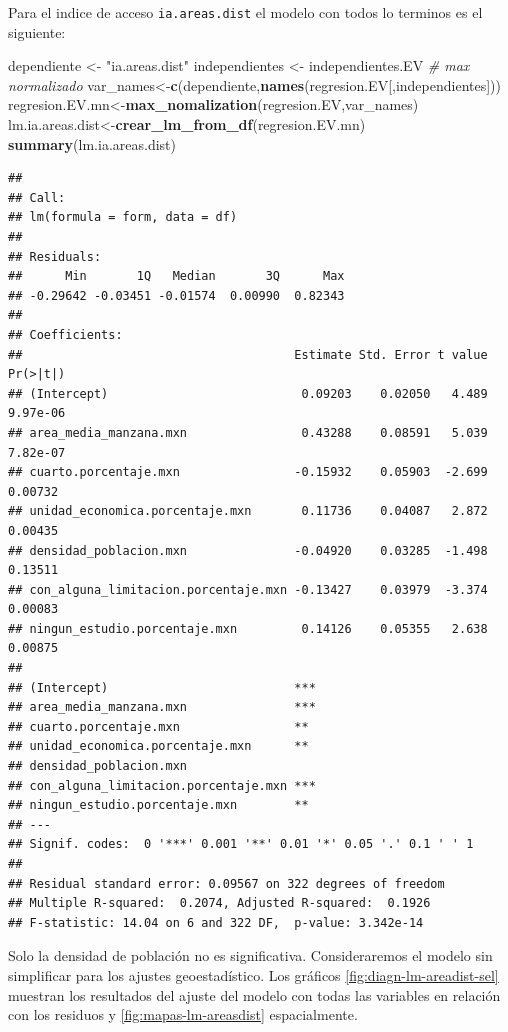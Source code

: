 \documentclass[12pt,]{book}
\newenvironment{Shaded}{\begin{snugshade}}{\end{snugshade}}
\newcommand{\KeywordTok}[1]{\textcolor[rgb]{0.13,0.29,0.53}{\textbf{#1}}}
\newcommand{\StringTok}[1]{\textcolor[rgb]{0.31,0.60,0.02}{#1}}
\newcommand{\CommentTok}[1]{\textcolor[rgb]{0.56,0.35,0.01}{\textit{#1}}}
\newcommand{\NormalTok}[1]{#1}
\begin{document}
Para el indice de acceso \texttt{ia.areas.dist} el modelo con todos lo
terminos es el siguiente:

\begin{Shaded}
\begin{Highlighting}[]
\NormalTok{dependiente <-}\StringTok{ "ia.areas.dist"}
\NormalTok{independientes  <-}\StringTok{ }\NormalTok{independientes.EV}
\CommentTok{# max normalizado }
\NormalTok{var_names<-}\KeywordTok{c}\NormalTok{(dependiente,}\KeywordTok{names}\NormalTok{(regresion.EV[,independientes]))}
\NormalTok{regresion.EV.mn<-}\KeywordTok{max_nomalization}\NormalTok{(regresion.EV,var_names)}
\NormalTok{lm.ia.areas.dist<-}\KeywordTok{crear_lm_from_df}\NormalTok{(regresion.EV.mn)}
\KeywordTok{summary}\NormalTok{(lm.ia.areas.dist)}
\end{Highlighting}
\end{Shaded}

\begin{verbatim}
## 
## Call:
## lm(formula = form, data = df)
## 
## Residuals:
##      Min       1Q   Median       3Q      Max 
## -0.29642 -0.03451 -0.01574  0.00990  0.82343 
## 
## Coefficients:
##                                      Estimate Std. Error t value Pr(>|t|)
## (Intercept)                           0.09203    0.02050   4.489 9.97e-06
## area_media_manzana.mxn                0.43288    0.08591   5.039 7.82e-07
## cuarto.porcentaje.mxn                -0.15932    0.05903  -2.699  0.00732
## unidad_economica.porcentaje.mxn       0.11736    0.04087   2.872  0.00435
## densidad_poblacion.mxn               -0.04920    0.03285  -1.498  0.13511
## con_alguna_limitacion.porcentaje.mxn -0.13427    0.03979  -3.374  0.00083
## ningun_estudio.porcentaje.mxn         0.14126    0.05355   2.638  0.00875
##                                         
## (Intercept)                          ***
## area_media_manzana.mxn               ***
## cuarto.porcentaje.mxn                ** 
## unidad_economica.porcentaje.mxn      ** 
## densidad_poblacion.mxn                  
## con_alguna_limitacion.porcentaje.mxn ***
## ningun_estudio.porcentaje.mxn        ** 
## ---
## Signif. codes:  0 '***' 0.001 '**' 0.01 '*' 0.05 '.' 0.1 ' ' 1
## 
## Residual standard error: 0.09567 on 322 degrees of freedom
## Multiple R-squared:  0.2074, Adjusted R-squared:  0.1926 
## F-statistic: 14.04 on 6 and 322 DF,  p-value: 3.342e-14
\end{verbatim}

Solo la densidad de población no es significativa. Consideraremos el
modelo sin simplificar para los ajustes geoestadístico. Los gráficos
\ref{fig:diagn-lm-areadist-sel} muestran los resultados del ajuste del
modelo con todas las variables en relación con los residuos y
\ref{fig:mapas-lm-areasdist} espacialmente.
\end{document}
